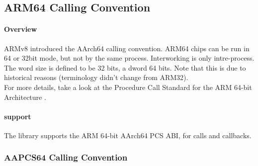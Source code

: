 %
%
%
%

\subsection{ARM64 Calling Convention}

\paragraph{Overview}

ARMv8 introduced the AArch64 calling convention. ARM64 chips can be run in 64 or 32bit mode, but not by the same process. Interworking is only intre-process.\\
The word size is defined to be 32 bits, a dword 64 bits. Note that this is due to historical reasons (terminology
didn't change from ARM32).\\
For more details, take a look at the Procedure Call Standard for the ARM 64-bit Architecture \cite{AAPCS64}.


\paragraph{ support}

The  library supports the ARM 64-bit AArch64 PCS ABI, for calls and callbacks.

\subsubsection{AAPCS64 Calling Convention}

